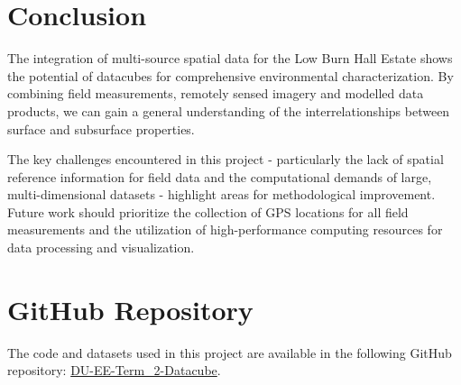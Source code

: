 \documentclass{article}
\begin{document}
\section{Conclusion}

The integration of multi-source spatial data for the Low Burn Hall Estate shows the potential of datacubes for comprehensive environmental characterization. By combining field measurements, remotely sensed imagery and modelled data products, we can gain a general understanding of the interrelationships between surface and subsurface properties.

The key challenges encountered in this project - particularly the lack of spatial reference information for field data and the computational demands of large, multi-dimensional datasets - highlight areas for methodological improvement. Future work should prioritize the collection of GPS locations for all field measurements and the utilization of high-performance computing resources for data processing and visualization.

\section{GitHub Repository}

The code and datasets used in this project are available in the following GitHub repository: \href{https://github.com/suddenBook/DU-EE-Term_2-Datacube}{DU-EE-Term\_2-Datacube}.
\end{document}
